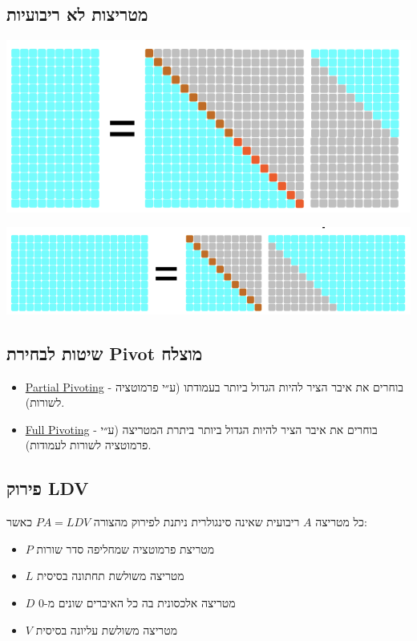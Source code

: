 \documentclass[11pt]{article}
\begin{document}
\subsection{מטריצות לא ריבועיות}
\label{sec:org64b7b0b}
\begin{center}
\includegraphics[width=.9\linewidth]{./img/m<n.png}
\end{center}
\begin{center}
\includegraphics[width=.9\linewidth]{./img/m>n.png}
\end{center}

\subsection{שיטות לבחירת Pivot מוצלח}
\label{sec:org3e87a4b}
\begin{itemize}
\item \uline{Partial Pivoting} - בוחרים את איבר הציר להיות הגדול ביותר בעמודתו (ע״י פרמוטציה לשורות).
\item \uline{Full Pivoting} - בוחרים את איבר הציר להיות הגדול ביותר ביתרת המטריצה (ע״י פרמוטציה לשורות לעמודות).
\end{itemize}

\subsection{פירוק LDV}
\label{sec:org57a5b6c}
כל מטריצה \(A\) ריבועית שאינה סינגולרית ניתנת לפירוק מהצורה \(PA=LDV\) כאשר:
\begin{itemize}
\item \(P\) מטריצת פרמוטציה שמחליפה סדר שורות
\item \(L\) מטריצה משולשת תחתונה בסיסית
\item \(D\) מטריצה אלכסונית בה כל האיברים שונים מ-0
\item \(V\) מטריצה משולשת עליונה בסיסית
\end{itemize}
\end{document}
